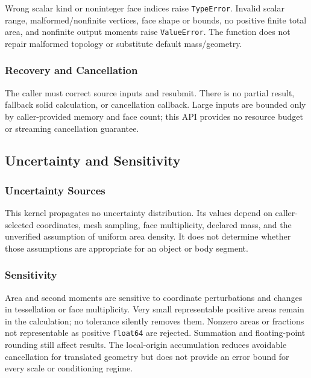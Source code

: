 \documentclass[
  american,
]{article}
\begin{document}
Wrong scalar kind or noninteger face indices raise \texttt{TypeError}.
Invalid scalar range, malformed/nonfinite vertices, face shape or
bounds, no positive finite total area, and nonfinite output moments
raise \texttt{ValueError}. The function does not repair malformed
topology or substitute default mass/geometry.

\subsubsection{Recovery and
Cancellation}\label{recovery-and-cancellation-1}

The caller must correct source inputs and resubmit. There is no partial
result, fallback solid calculation, or cancellation callback. Large
inputs are bounded only by caller-provided memory and face count; this
API provides no resource budget or streaming cancellation guarantee.

\subsection{Uncertainty and
Sensitivity}\label{uncertainty-and-sensitivity-1}

\subsubsection{Uncertainty Sources}\label{uncertainty-sources-1}

This kernel propagates no uncertainty distribution. Its values depend on
caller-selected coordinates, mesh sampling, face multiplicity, declared
mass, and the unverified assumption of uniform area density. It does not
determine whether those assumptions are appropriate for an object or
body segment.

\subsubsection{Sensitivity}\label{sensitivity-1}

Area and second moments are sensitive to coordinate perturbations and
changes in tessellation or face multiplicity. Very small representable
positive areas remain in the calculation; no tolerance silently removes
them. Nonzero areas or fractions not representable as positive
\texttt{float64} are rejected. Summation and floating-point rounding
still affect results. The local-origin accumulation reduces avoidable
cancellation for translated geometry but does not provide an error bound
for every scale or conditioning regime.
\end{document}

